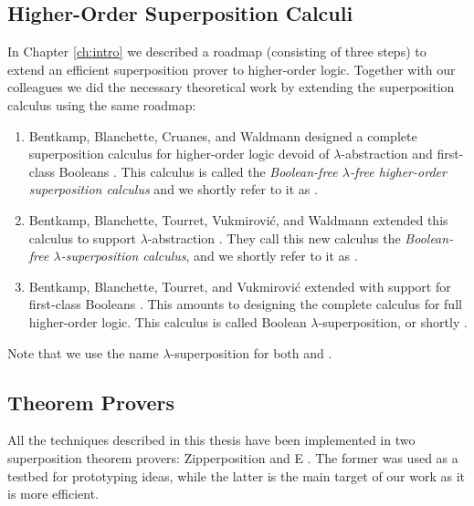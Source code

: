 \subsection{Higher-Order Superposition Calculi}
\label{sec:pre:ho-sup-calculi}

In Chapter \ref{ch:intro} we described a roadmap (consisting of three steps) to
extend an efficient superposition prover to higher-order logic. Together with
our colleagues we did the necessary theoretical work by extending the
superposition calculus using the same roadmap:

\begin{enumerate}
    \item Bentkamp, Blanchette, Cruanes, and Waldmann designed a complete
    superposition calculus for higher-order logic devoid of
    $\lambda$-abstraction and first-class Booleans \cite{bbcw-21-lfho}. This calculus is called the \emph{Boolean-free $\lambda$-free higher-order superposition calculus} 
    and we shortly refer to it as \lfsup{}.
    \item \begin{sloppypar}
    Bentkamp, Blanchette, Tourret,  Vukmirović, and Waldmann
    extended this calculus to support $\lambda$-abstraction
    \cite{bbtvw-21-sup-lam}. They call this new calculus the \emph{Boolean-free $\lambda$-superposition calculus},
    and we shortly refer to it as \lsup{}.
    \end{sloppypar}        
    \item Bentkamp, Blanchette, Tourret, and Vukmirovi\'c extended \lsup{} with
    support for first-class Booleans \cite{bbtv-21-full-ho-sup}. This amounts to
    designing the complete calculus for full higher-order logic. This
    calculus is called Boolean $\lambda$-superposition, or shortly \osup{}.
\end{enumerate}
%
Note that we use the name $\lambda$-superposition for both \lsup{}
and \osup{}.

\subsection{Theorem Provers}
\label{sec:pre:theorem-provers}

All the techniques described in this thesis have been implemented in two superposition
theorem provers: Zipperposition
\cite{sc-15-simon-phd,sc-supind-17} and E \cite{ss-02-brainiac}. The former was used as a testbed for
prototyping ideas, while the latter is the main target of our work as it is more
efficient.

